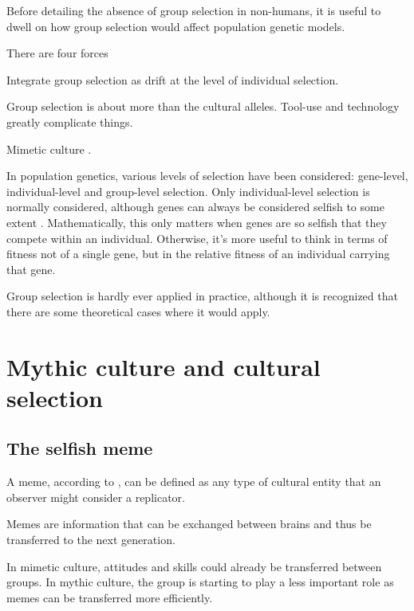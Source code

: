 \documentclass{article}
\begin{document}
Before detailing the absence of group selection in non-humans, it is useful to
dwell on how group selection would affect population genetic models.

There are four forces 

Integrate group selection as drift at the level of individual selection.

Group selection is about more than the cultural alleles. Tool-use and technology greatly complicate things.

Mimetic culture \citet{donald1991}.




In population genetics, various levels of selection have been considered: gene-level, individual-level and group-level selection. Only individual-level selection is normally considered, although genes can always be considered selfish to some extent \citep{dawkins1976}. Mathematically, this only matters when genes are so selfish that they compete within an individual. Otherwise, it's more useful to think in terms of fitness not of a single gene, but in the relative fitness of an individual carrying that gene.

Group selection is hardly ever applied in practice, although it is recognized that there are some theoretical cases where it would apply.


\section{Mythic culture and cultural selection}

\subsection{The selfish meme}
\label{sec:memes}

A meme, according to \citet{dawkins1976}, can be defined as any type of cultural entity that an observer might consider a replicator.

Memes are information that can be exchanged between brains and thus be transferred to the next generation.

In mimetic culture, attitudes and skills could already be transferred between groups.
In mythic culture, the group is starting to play a less important role as memes can be transferred more efficiently.
\end{document}
